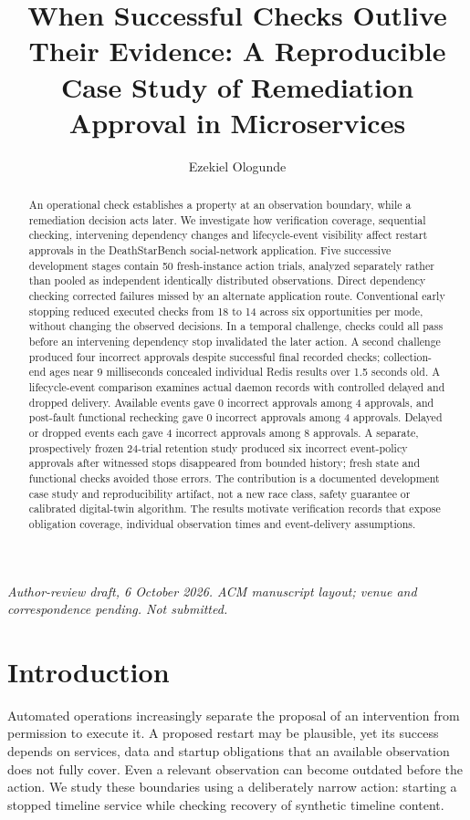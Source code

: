 \documentclass[manuscript,review,nonacm]{acmart}
\title{When Successful Checks Outlive Their Evidence: A Reproducible Case Study of Remediation Approval in Microservices}
\author{Ezekiel Ologunde}
\affiliation{\institution{Independent Researcher}}
\begin{document}
\begin{abstract}
An operational check establishes a property at an observation boundary, while a remediation decision acts later. We investigate how verification coverage, sequential checking, intervening dependency changes and lifecycle-event visibility affect restart approvals in the DeathStarBench social-network application. Five successive development stages contain 50 fresh-instance action trials, analyzed separately rather than pooled as independent identically distributed observations. Direct dependency checking corrected failures missed by an alternate application route. Conventional early stopping reduced executed checks from 18 to 14 across six opportunities per mode, without changing the observed decisions. In a temporal challenge, checks could all pass before an intervening dependency stop invalidated the later action. A second challenge produced four incorrect approvals despite successful final recorded checks; collection-end ages near 9 milliseconds concealed individual Redis results over 1.5 seconds old. A lifecycle-event comparison examines actual daemon records with controlled delayed and dropped delivery. Available events gave 0 incorrect approvals among 4 approvals, and post-fault functional rechecking gave 0 incorrect approvals among 4 approvals. Delayed or dropped events each gave 4 incorrect approvals among 8 approvals. A separate, prospectively frozen 24-trial retention study produced six incorrect event-policy approvals after witnessed stops disappeared from bounded history; fresh state and functional checks avoided those errors. The contribution is a documented development case study and reproducibility artifact, not a new race class, safety guarantee or calibrated digital-twin algorithm. The results motivate verification records that expose obligation coverage, individual observation times and event-delivery assumptions.
\end{abstract}
\maketitle
\noindent\textit{Author-review draft, 6 October 2026. ACM manuscript layout; venue and correspondence pending. Not submitted.}

\section{Introduction}
Automated operations increasingly separate the proposal of an intervention from permission to execute it. A proposed restart may be plausible, yet its success depends on services, data and startup obligations that an available observation does not fully cover. Even a relevant observation can become outdated before the action. We study these boundaries using a deliberately narrow action: starting a stopped timeline service while checking recovery of synthetic timeline content.
\end{document}
